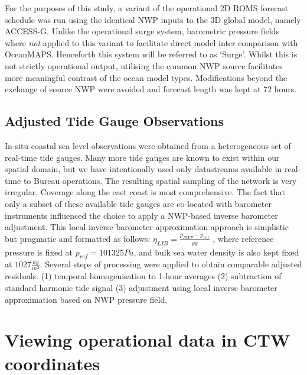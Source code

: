 For the purposes of this study, a variant of the operational 2D ROMS forecast schedule was run using the identical NWP inputs to the 3D global model, namely ACCESS-G.   
Unlike the operational surge system, barometric pressure fields where \emph{not} applied to this variant to facilitate direct model inter comparison with OceanMAPS.
Henceforth this system will be referred to as `Surge'.
Whilst this is not strictly operational output, utilising the common NWP source facilitates more meaningful contrast of the ocean model types. 
Modifications beyond the exchange of source NWP were avoided and forecast length was kept at 72 hours.


\subsection{ Adjusted Tide Gauge Observations }
In-situ coastal sea level observations were obtained from a heterogeneous set of real-time tide gauges. 
Many more tide gauges are known to exist within our spatial domain, but we have intentionally used only datastreams available in real-time to Bureau operations.
The resulting spatial sampling of the network is very irregular. 
Coverage along the east coast is most comprehensive.   
The fact that only a subset of these available tide gauges are co-located with barometer instruments influenced the choice to apply a NWP-based inverse barometer adjustment.
This local inverse barometer approximation approach is simplistic \citep{Mathers:2004bk} but pragmatic and formatted as follows:
$ \eta_{LIB} = \frac{ p_{NWP} - p_{ref} }{ \rho g } $
, where reference pressure is fixed at $p_{ref}=101325Pa$, and bulk sea water density is also kept fixed at $1027\frac{kg}{m^3}$. 
Several steps of processing were applied to obtain comparable adjusted residuals.
(1) temporal homogenisation to 1-hour averages (2) subtraction of standard harmonic tide signal (3) adjustment using local inverse barometer approximation based on NWP pressure field.

\section{Viewing operational data in CTW coordinates}

